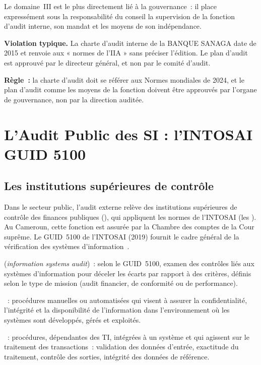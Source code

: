 Le domaine~III est le plus directement lié à la gouvernance~: il place
expressément sous la responsabilité du conseil la supervision de la
fonction d'audit interne, son mandat et les moyens de son indépendance.

\begin{boxalert}
\textbf{Violation typique.} La charte d'audit interne de la BANQUE SANAGA
date de 2015 et renvoie aux « normes de l'IIA » sans préciser l'édition.
Le plan d'audit est approuvé par le directeur général, et non par le
comité d'audit.

\smallskip
\textbf{Règle~:} la charte d'audit doit se référer aux Normes mondiales de
2024, et le plan d'audit comme les moyens de la fonction doivent être
approuvés par l'organe de gouvernance, non par la direction auditée.
\end{boxalert}

\section{L'Audit Public des SI : l'INTOSAI GUID 5100}
\label{sec:c11-intosai}

\subsection{Les institutions supérieures de contrôle}

Dans le secteur public, l'audit externe relève des institutions
supérieures de contrôle des finances publiques (), qui
appliquent les normes de l'INTOSAI (les ). Au Cameroun, cette
fonction est assurée par la Chambre des comptes de la Cour suprême. Le
GUID~5100 de l'INTOSAI (2019) fournit le cadre général de la vérification
des systèmes d'information~\cite{intosai2019guid5100}.

\begin{boxdef}
 (\textit{information systems audit})~: selon le
GUID~5100, examen des contrôles liés aux systèmes d'information pour
déceler les écarts par rapport à des critères, définis selon le type de
mission (audit financier, de conformité ou de performance).

\medskip
{}~: procédures
manuelles ou automatisées qui visent à assurer la confidentialité,
l'intégrité et la disponibilité de l'information dans l'environnement où
les systèmes sont développés, gérés et exploités.

\medskip
{}~:
procédures, dépendantes des TI, intégrées à un système et qui agissent sur
le traitement des transactions~: validation des données d'entrée,
exactitude du traitement, contrôle des sorties, intégrité des données de
référence.
\end{boxdef}

